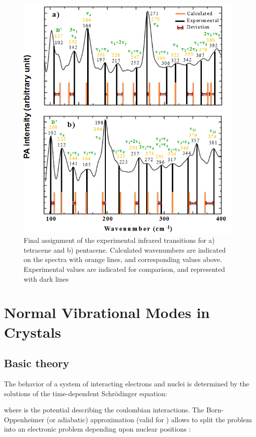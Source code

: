  \begin{figure}
 	\centering
 	\includegraphics[scale=0.8]{image/final-exp}
 	\caption[Final assignment of the experimental infrared transitions for tetracene and pentacene]{Final assignment of the experimental infrared transitions for a) tetracene and b) pentacene. Calculated wavenumbers are indicated on the spectra with orange lines, and corresponding values above. Experimental values are indicated for comparison, and represented with dark lines}
 \end{figure}
 
 \section{Normal Vibrational Modes in Crystals}
 
 \subsection{Basic theory}
 
 The behavior of a system of interacting electrons  and nuclei is determined by the solutions of the time-dependent Schrödinger equation:
 
 where is the potential describing the coulombian interactions. The Born-Oppenheimer (or adiabatic) approximation (valid for ) allows to split the problem into an electronic problem depending upon nuclear positions :
 
